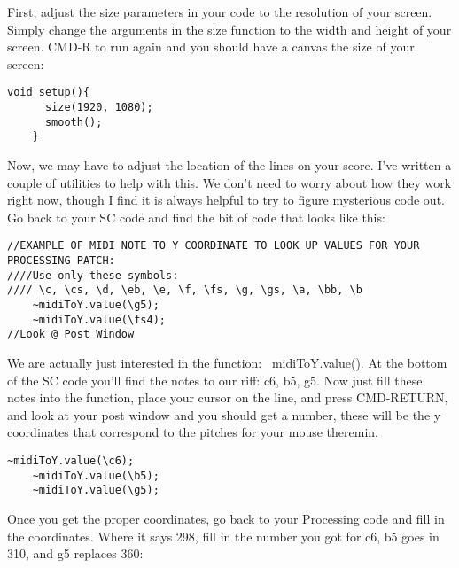 \documentclass[twoside,a4paper]{refart}
\DeclareRobustCommand\cs[1]{\texttt{\char`\\#1}}
\begin{document}
First, adjust the size parameters in your code to the resolution of your screen.  Simply change the arguments in the size function to the width and height of your screen.  CMD-R to run again and you should have a canvas the size of your screen:

\begin{changemargin}{-1.5cm}{0.0cm} 
	\begin{lstlisting}[style=Processing, caption={Change Canvas Size}]
	void setup(){
	  size(1920, 1080);
	  smooth();
	}
	\end{lstlisting}
\end{changemargin}

Now, we may have to adjust the location of the lines on your score.  I've written a couple of utilities to help with this.  We don't need to worry about how they work right now, though I find it is always helpful to try to figure mysterious code out.  Go back to your SC code and find the bit of code that looks like this:

\begin{changemargin}{-1.5cm}{0.0cm} 
	\begin{lstlisting}[style=SuperCollider-IDE, backgroundcolor=\color{highlight},linewidth=13.8cm]
//EXAMPLE OF MIDI NOTE TO Y COORDINATE TO LOOK UP VALUES FOR YOUR PROCESSING PATCH:
////Use only these symbols:
//// \c, \cs, \d, \eb, \e, \f, \fs, \g, \gs, \a, \bb, \b
	~midiToY.value(\g5);
	~midiToY.value(\fs4);
//Look @ Post Window
	\end{lstlisting}
\end{changemargin}

We are actually just interested in the function: ~midiToY.value().  At the bottom of the SC code you'll find the notes to our riff: c6, b5, g5.  Now just fill these notes into the function, place your cursor on the line, and press CMD-RETURN, and look at your post window and you should get a number, these will be the y coordinates that correspond to the pitches for your mouse theremin.

\begin{changemargin}{-1.5cm}{0.0cm} 
	\begin{lstlisting}[style=SuperCollider-IDE, backgroundcolor=\color{highlight},linewidth=13.8cm]
	~midiToY.value(\c6);
	~midiToY.value(\b5);
	~midiToY.value(\g5);
	\end{lstlisting}
\end{changemargin}

Once you get the proper coordinates, go back to your Processing code and fill in the coordinates.  Where it says 298, fill in the number you got for c6, b5 goes in 310, and g5 replaces 360:
\end{document}
